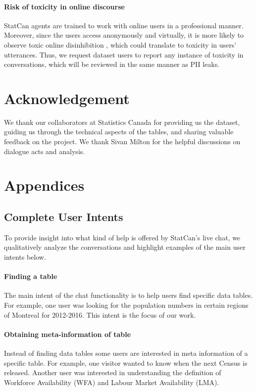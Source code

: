 \documentclass[11pt]{article}
\begin{document}
\paragraph{Risk of toxicity in online discourse}
StatCan agents are trained to work with online users in a professional manner. Moreover, since the users access  anonymously and virtually, it is more likely to observe toxic online disinhibition \citep{lapidot-lefler_effects_2012}, which could translate to toxicity in users' utterances. Thus, we request dataset users to report any instance of toxicity in conversations, which will be reviewed in the same manner as PII leaks. 

\section*{Acknowledgement}
We thank our collaborators at Statistics Canada for providing us the dataset, guiding us through the technical aspects of the tables, and sharing valuable feedback on the project. We thank Sivan Milton for the helpful discussions on dialogue acts and analysis.






\appendix

\section{Appendices}
\label{sec:appendix}

\subsection{Complete User Intents}
\label{sec:userintents}

To provide insight into what kind of help is offered by StatCan's live chat, we qualitatively analyze the conversations and highlight examples of the main user intents below. 

\paragraph{Finding a table} The main intent of the chat functionality is to help users find specific data tables. For example, one user was looking for the  population numbers in certain regions of Montreal for 2012-2016. This intent is the focus of our work.

\paragraph{Obtaining meta-information of table} Instead of finding data tables some users are interested in meta information of a specific table. For example, one visitor wanted to know when the next Census is released. Another user was interested in understanding the definition of Workforce Availability (WFA) and Labour Market Availability (LMA). 
\end{document}
